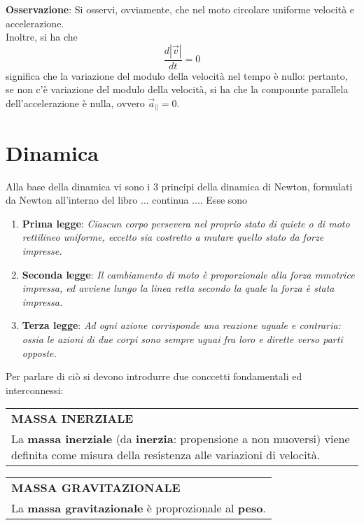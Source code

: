 \documentclass[a4paper]{extarticle}
\renewcommand\arraystretch{}
\begin{document}
\vspace{1em}
\noindent
\textbf{Osservazione}: Si osservi, ovviamente, che nel moto circolare uniforme velocità e accelerazione.\\
Inoltre, si ha che
\[\frac{d \left \vert \vec{v} \right \vert}{dt} = 0\]
significa che la variazione del modulo della velocità nel tempo è nullo: pertanto, se non c'è variazione del modulo della velocità, si ha che la componnte parallela dell'accelerazione è nulla, ovvero $\vec{a}_\parallel = 0$.

\newpage
\section{Dinamica}
Alla base della dinamica vi sono i $3$ principi della dinamica di Newton, formulati da Newton all'interno del libro ... continua .... Esse sono
\begin{enumerate}
  \item \textbf{Prima legge}: \emph{Ciascun corpo persevera nel proprio stato di quiete o di moto rettilineo uniforme, eccetto sia costretto a mutare quello stato da forze impresse.}
  \item \textbf{Seconda legge}: \emph{Il cambiamento di moto è proporzionale alla forza mmotrice impressa, ed avviene lungo la linea retta secondo la quale la forza è stata impressa.}
  \item \textbf{Terza legge}: \emph{Ad ogni azione corrisponde una reazione uguale e contraria: ossia le azioni di due corpi sono sempre uguai fra loro e dirette verso parti opposte.}
\end{enumerate}
Per parlare di ciò si devono introdurre due conccetti fondamentali ed interconnessi:

\vspace{1em}
\setlength{\tabcolsep}{14pt}
\renewcommand{\arraystretch}{2}
\noindent
\begin{tabularx}{\textwidth}{@{}|P|@{}}
    \hline
    {\textbf{MASSA INERZIALE}}\\
    \parbox{\linewidth}{La \textbf{massa inerziale} (da \textbf{inerzia}: propensione a non muoversi) viene definita come misura della resistenza alle variazioni di velocità.
    \vspace{3mm}}\\
    \hline
\end{tabularx}
\vspace{1em}

\vspace{1em}
\setlength{\tabcolsep}{14pt}
\renewcommand{\arraystretch}{2}
\noindent
\begin{tabularx}{\textwidth}{@{}|P|@{}}
    \hline
    {\textbf{MASSA GRAVITAZIONALE}}\\
    \parbox{\linewidth}{La \textbf{massa gravitazionale} è proprozionale al \textbf{peso}.
    \vspace{3mm}}\\
    \hline
\end{tabularx}
\vspace{1em}
\end{document}
